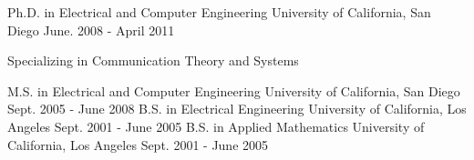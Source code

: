 

\begin{cventries}

  \cventry
    {Ph.D. in Electrical and Computer Engineering}
    {University of California, San Diego}
    {June. 2008 - April 2011}
    {}
    {
      \begin{cvitems} %
        \item {Specializing in Communication Theory and Systems}
      \end{cvitems}
    }
  \cventry
    {M.S. in Electrical and Computer Engineering}
    {University of California, San Diego}
    {Sept. 2005 - June 2008}
    {}
    {}
  \cventry
    {B.S. in Electrical Engineering}
    {University of California, Los Angeles}
    {Sept. 2001 - June 2005}
    {}
    {}
  \cventry
    {B.S. in Applied Mathematics}
    {University of California, Los Angeles}
    {Sept. 2001 - June 2005}
    {}
    {}

\end{cventries}
